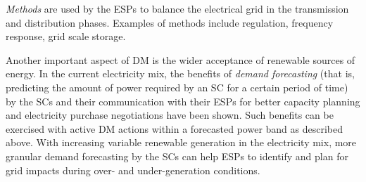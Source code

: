 \emph{Methods} are used by the ESPs to balance the electrical grid in the transmission and distribution phases. Examples of methods include regulation, frequency response, grid scale storage. %

Another important aspect of DM is the wider acceptance of renewable sources of energy. In the current electricity mix, the benefits of \emph{demand forecasting} (that is, predicting the amount of power required by an SC for a certain period of time) by the SCs and their communication with their ESPs for better capacity planning and electricity purchase negotiations have been shown. Such benefits can be exercised with active DM actions within a forecasted power band as described above. With increasing variable renewable generation in the electricity mix, more granular demand forecasting by the SCs can help ESPs to identify and plan for grid impacts during over- and under-generation conditions. 